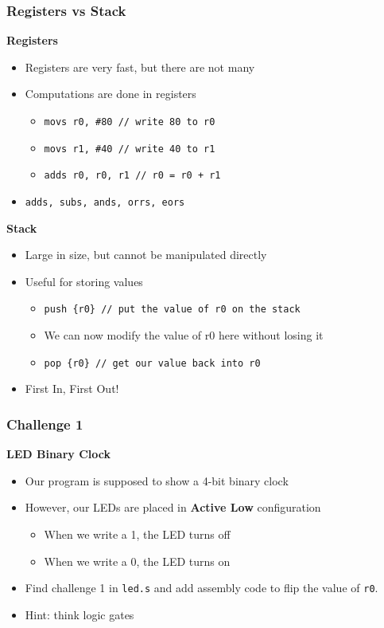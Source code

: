 \documentclass{beamer}
\begin{document}
\begin{frame}
	\frametitle{Registers vs Stack}
	\textbf{Registers}
	\begin{itemize}
		\item Registers are very fast, but there are not many
		\item Computations are done in registers
		\begin{itemize}
			\item \texttt{movs r0, \#80 // write 80 to r0}
			\item \texttt{movs r1, \#40 // write 40 to r1}
			\item \texttt{adds r0, r0, r1 // r0 = r0 + r1}
		\end{itemize}
		\item \texttt{adds, subs, ands, orrs, eors}
	\end{itemize}

	\textbf{Stack}
	\begin{itemize}
		\item Large in size, but cannot be manipulated directly
		\item Useful for storing values
		\begin{itemize}
			\item \texttt{push \{r0\} // put the value of r0 on the stack}
			\item We can now modify the value of r0 here without losing it
			\item \texttt{pop \{r0\} // get our value back into r0}
		\end{itemize}
		\item First In, First Out!
	\end{itemize}
\end{frame}

\begin{frame}
	\frametitle{Challenge 1}
	\textbf{LED Binary Clock}
	\begin{itemize}
		\item Our program is supposed to show a 4-bit binary clock
		\item However, our LEDs are placed in \textbf{Active Low} configuration
		\begin{itemize}
			\item When we write a 1, the LED turns off
			\item When we write a 0, the LED turns on
		\end{itemize}
		\item Find challenge 1 in \texttt{led.s} and add assembly code to flip the value of \texttt{r0}.
		\item Hint: think logic gates
	\end{itemize}
\end{frame}
\end{document}
